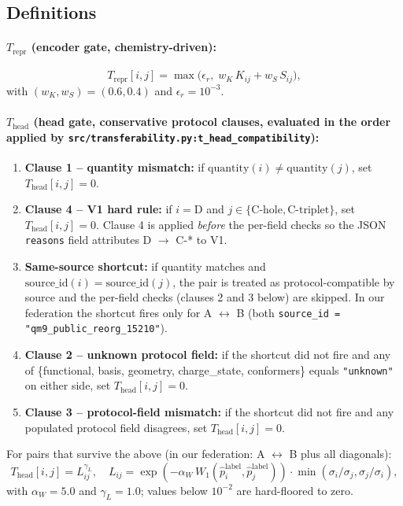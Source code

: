 \documentclass[11pt,a4paper]{article}
\begin{document}
\subsection{Definitions}

\paragraph{$T_{\mathrm{repr}}$ (encoder gate, chemistry-driven):}
\[
T_{\mathrm{repr}}[i, j] = \max\!\bigl(\epsilon_r,\; w_K\, K_{ij} + w_S\, S_{ij}\bigr),
\]
with $(w_K, w_S) = (0.6, 0.4)$ and $\epsilon_r = 10^{-3}$.

\paragraph{$T_{\mathrm{head}}$ (head gate, conservative protocol clauses, evaluated in the order applied by \texttt{src/transferability.py:t\_head\_compatibility}):}
\begin{enumerate}
  \item \textbf{Clause 1 -- quantity mismatch:} if $\mathrm{quantity}(i) \ne \mathrm{quantity}(j)$, set $T_{\mathrm{head}}[i, j] = 0$.
  \item \textbf{Clause 4 -- V1 hard rule:} if $i = \mathrm{D}$ and $j \in \{\mathrm{C\text{-}hole}, \mathrm{C\text{-}triplet}\}$, set $T_{\mathrm{head}}[i, j] = 0$. Clause 4 is applied \emph{before} the per-field checks so the JSON \texttt{reasons} field attributes D $\to$ C-* to V1.
  \item \textbf{Same-source shortcut:} if quantity matches and $\mathrm{source\_id}(i) = \mathrm{source\_id}(j)$, the pair is treated as protocol-compatible by source and the per-field checks (clauses 2 and 3 below) are skipped. In our federation the shortcut fires only for A $\leftrightarrow$ B (both \texttt{source\_id = "qm9\_public\_reorg\_15210"}).
  \item \textbf{Clause 2 -- unknown protocol field:} if the shortcut did not fire and any of \{functional, basis, geometry, charge\_state, conformers\} equals \texttt{"unknown"} on either side, set $T_{\mathrm{head}}[i, j] = 0$.
  \item \textbf{Clause 3 -- protocol-field mismatch:} if the shortcut did not fire and any populated protocol field disagrees, set $T_{\mathrm{head}}[i, j] = 0$.
\end{enumerate}
For pairs that survive the above (in our federation: A $\leftrightarrow$ B plus all diagonals):
\[
T_{\mathrm{head}}[i, j] = L_{ij}^{\gamma_L},\quad
L_{ij} = \exp(-\alpha_W\,W_1(\hat p_i^{\mathrm{label}}, \hat p_j^{\mathrm{label}})) \cdot \min(\sigma_i/\sigma_j, \sigma_j/\sigma_i),
\]
with $\alpha_W = 5.0$ and $\gamma_L = 1.0$; values below $10^{-2}$ are hard-floored to zero.
\end{document}
